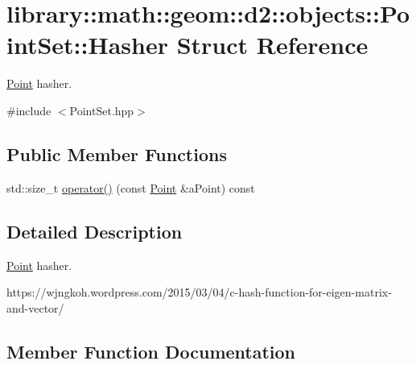 \hypertarget{structlibrary_1_1math_1_1geom_1_1d2_1_1objects_1_1_point_set_1_1_hasher}{}\section{library\+:\+:math\+:\+:geom\+:\+:d2\+:\+:objects\+:\+:Point\+Set\+:\+:Hasher Struct Reference}
\label{structlibrary_1_1math_1_1geom_1_1d2_1_1objects_1_1_point_set_1_1_hasher}


\hyperlink{classlibrary_1_1math_1_1geom_1_1d2_1_1objects_1_1_point}{Point} hasher.  




{\ttfamily \#include $<$Point\+Set.\+hpp$>$}

\subsection*{Public Member Functions}
\begin{DoxyCompactItemize}
\item 
std\+::size\+\_\+t \hyperlink{structlibrary_1_1math_1_1geom_1_1d2_1_1objects_1_1_point_set_1_1_hasher_a78fe89e226ef09f1d38599510daa0f0e}{operator()} (const \hyperlink{classlibrary_1_1math_1_1geom_1_1d2_1_1objects_1_1_point}{Point} \&a\+Point) const
\end{DoxyCompactItemize}


\subsection{Detailed Description}
\hyperlink{classlibrary_1_1math_1_1geom_1_1d2_1_1objects_1_1_point}{Point} hasher. 

https\+://wjngkoh.wordpress.\+com/2015/03/04/c-\/hash-\/function-\/for-\/eigen-\/matrix-\/and-\/vector/ 

\subsection{Member Function Documentation}
\mbox{\label{structlibrary_1_1math_1_1geom_1_1d2_1_1objects_1_1_point_set_1_1_hasher_a78fe89e226ef09f1d38599510daa0f0e}} 
